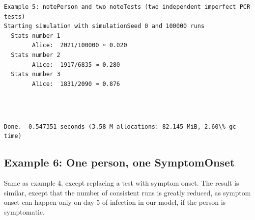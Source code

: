\documentclass[11pt]{article}
\begin{document}
    \begin{Verbatim}[commandchars=\\\{\}]
Example 5: notePerson and two noteTests (two independent imperfect PCR tests)
Starting simulation with simulationSeed 0 and 100000 runs
  Stats number 1
        Alice:  2021/100000 ≈ 0.020
  Stats number 2
        Alice:  1917/6835 ≈ 0.280
  Stats number 3
        Alice:  1831/2090 ≈ 0.876
    \end{Verbatim}

    \begin{center}
    \end{center}
    { \hspace*{\fill} \\}
    
    \begin{Verbatim}[commandchars=\\\{\}]

Done.  0.547351 seconds (3.58 M allocations: 82.145 MiB, 2.60\% gc time)
    \end{Verbatim}
\newpage
    \hypertarget{example-6-one-person-one-symptomonset}{%
\subsection{Example 6: One person, one
SymptomOnset}\label{example-6-one-person-one-symptomonset}}

Same as example 4, except replacing a test with symptom onset. The
result is similar, except that the number of consistent runs is greatly
reduced, as symptom onset can happen only on day 5 of infection in our
model, if the person is symptomatic.
\end{document}
